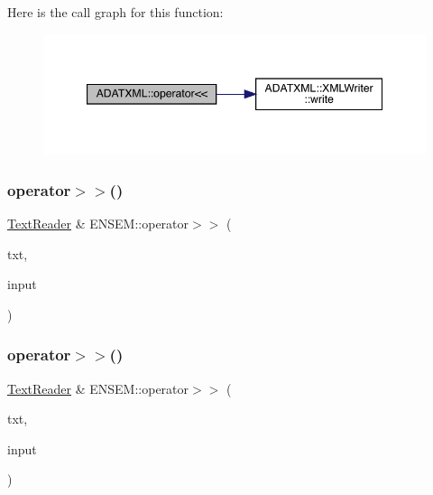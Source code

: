 Here is the call graph for this function\+:\nopagebreak
\begin{figure}[H]
\begin{center}
\leavevmode
\includegraphics[width=347pt]{d2/da3/group__io_ga9d2ed7a5f0ca12a3b4f993f19ee4473e_cgraph}
\end{center}
\end{figure}
\mbox{\label{group__io_ga03bd5b812dccb5e134a27e34c6e375bb}} 
\subsubsection{\texorpdfstring{operator$>$$>$()}{operator>>()}\hspace{0.1cm}{\footnotesize\ttfamily [1/11]}}
{\footnotesize\ttfamily \mbox{\hyperlink{classENSEM_1_1TextReader}{Text\+Reader}} \& E\+N\+S\+E\+M\+::operator$>$$>$ (\begin{DoxyParamCaption}\item[{\mbox{\hyperlink{classENSEM_1_1TextReader}{Text\+Reader}} \&}]{txt,  }\item[{std\+::string \&}]{input }\end{DoxyParamCaption})}

\mbox{\label{group__io_ga4eecbfcd47e20672ad52ed41560f8573}} 
\subsubsection{\texorpdfstring{operator$>$$>$()}{operator>>()}\hspace{0.1cm}{\footnotesize\ttfamily [2/11]}}
{\footnotesize\ttfamily \mbox{\hyperlink{classENSEM_1_1TextReader}{Text\+Reader}} \& E\+N\+S\+E\+M\+::operator$>$$>$ (\begin{DoxyParamCaption}\item[{\mbox{\hyperlink{classENSEM_1_1TextReader}{Text\+Reader}} \&}]{txt,  }\item[{char \&}]{input }\end{DoxyParamCaption})}

